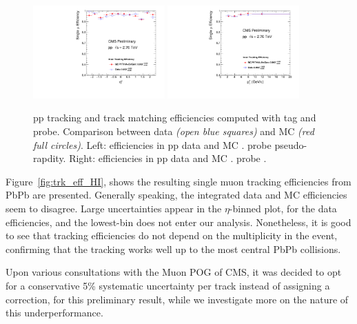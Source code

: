 \begin{figure}
  \begin{center}
    \includegraphics[width=0.45\textwidth]{Chapters/aCorrection/Trk_Comp_pp_eta_RD_MC.pdf}
    \includegraphics[width=0.45\textwidth]{Chapters/aCorrection/Trk_Comp_pp_pt_RD_MC.pdf}
%
    \caption{
      pp tracking and track matching efficiencies computed with tag and
      probe. Comparison between data \emph{(open blue squares)} and MC
      \emph{(red full circles)}.
      Left: efficiencies in pp data and MC \vs. probe pseudo-rapdity.
      Right: efficiencies in pp data and MC \vs. probe \pt.
    }
    \label{fig:trk_eff_pp}
  \end{center}
\end{figure}

Figure~\ref{fig:trk_eff_HI}, shows the resulting
single muon tracking efficiencies from PbPb are
presented. Generally speaking, the integrated data and MC efficiencies
seem to disagree. Large uncertainties appear in the $\eta$-binned plot, for the
data efficiencies, and the lowest-\pt bin does not enter our
analysis. Nonetheless, it is good to see that tracking efficiencies do not
depend on the multiplicity in the event, confirming that the tracking
works well up to the most central PbPb collisions.

Upon various consultations with the Muon POG of
CMS, it was decided to opt for a conservative 5\% systematic
uncertainty per track instead of assigning a correction, for this
preliminary result, while we investigate more on the nature of this underperformance.

